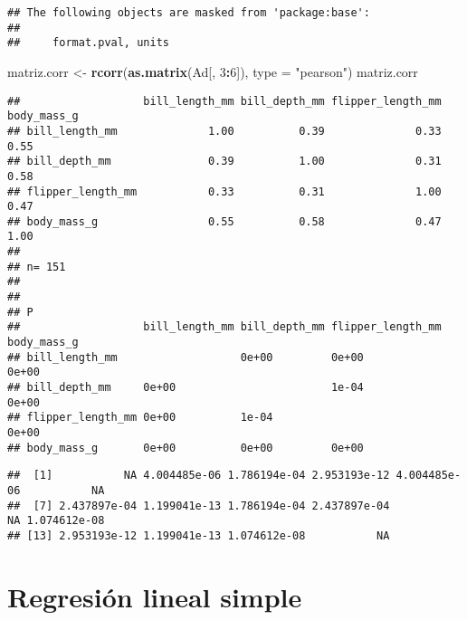\documentclass[
]{book}
\newenvironment{Shaded}{\begin{snugshade}}{\end{snugshade}}
\newcommand{\DataTypeTok}[1]{\textcolor[rgb]{0.13,0.29,0.53}{#1}}
\newcommand{\DecValTok}[1]{\textcolor[rgb]{0.00,0.00,0.81}{#1}}
\newcommand{\KeywordTok}[1]{\textcolor[rgb]{0.13,0.29,0.53}{\textbf{#1}}}
\newcommand{\NormalTok}[1]{#1}
\newcommand{\OperatorTok}[1]{\textcolor[rgb]{0.81,0.36,0.00}{\textbf{#1}}}
\newcommand{\StringTok}[1]{\textcolor[rgb]{0.31,0.60,0.02}{#1}}
\begin{document}
\begin{verbatim}
## The following objects are masked from 'package:base':
## 
##     format.pval, units
\end{verbatim}

\begin{Shaded}
\begin{Highlighting}[]
\NormalTok{matriz.corr <-}\StringTok{ }\KeywordTok{rcorr}\NormalTok{(}\KeywordTok{as.matrix}\NormalTok{(Ad[, }\DecValTok{3}\OperatorTok{:}\DecValTok{6}\NormalTok{]), }\DataTypeTok{type =} \StringTok{"pearson"}\NormalTok{)}
\NormalTok{matriz.corr}
\end{Highlighting}
\end{Shaded}

\begin{verbatim}
##                   bill_length_mm bill_depth_mm flipper_length_mm body_mass_g
## bill_length_mm              1.00          0.39              0.33        0.55
## bill_depth_mm               0.39          1.00              0.31        0.58
## flipper_length_mm           0.33          0.31              1.00        0.47
## body_mass_g                 0.55          0.58              0.47        1.00
## 
## n= 151 
## 
## 
## P
##                   bill_length_mm bill_depth_mm flipper_length_mm body_mass_g
## bill_length_mm                   0e+00         0e+00             0e+00      
## bill_depth_mm     0e+00                        1e-04             0e+00      
## flipper_length_mm 0e+00          1e-04                           0e+00      
## body_mass_g       0e+00          0e+00         0e+00
\end{verbatim}

\begin{Shaded}
\end{Shaded}

\begin{verbatim}
##  [1]           NA 4.004485e-06 1.786194e-04 2.953193e-12 4.004485e-06           NA
##  [7] 2.437897e-04 1.199041e-13 1.786194e-04 2.437897e-04           NA 1.074612e-08
## [13] 2.953193e-12 1.199041e-13 1.074612e-08           NA
\end{verbatim}

\hypertarget{regresiuxf3n-lineal-simple}{%
\section{Regresión lineal simple}\label{regresiuxf3n-lineal-simple}}
\end{document}
